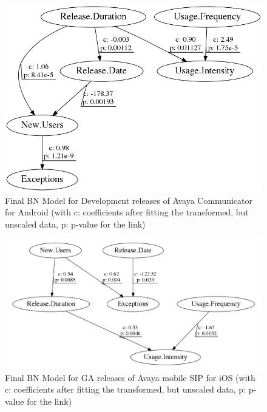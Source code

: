 \documentclass[smallcondensed]{svjour3}     %
\begin{document}
\begin{figure}[!t]
\centering
\includegraphics[width=0.7\linewidth]{AD}%
\caption{Final BN Model for Development releases of Avaya Communicator for Android (with c: coefficients after fitting the transformed, but unscaled data, p: p-value  for the link) }
\label{fig:finalAD}
\vspace{-10pt}
\end{figure}

\begin{figure}[!t]
\centering
\includegraphics[width=0.7\linewidth]{i}%
\caption{Final BN Model for GA releases of Avaya mobile SIP for iOS (with c: coefficients after fitting the transformed, but unscaled data, p: p-value  for the link) }
\label{fig:finalI}
\vspace{-10pt}
\end{figure}
\end{document}
